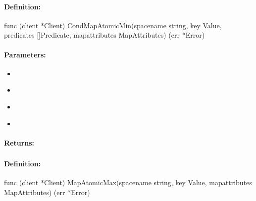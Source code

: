 \paragraph{Definition:}
\begin{gocode}
func (client *Client) CondMapAtomicMin(spacename string, key Value, predicates []Predicate, mapattributes MapAttributes) (err *Error)
\end{gocode}

\paragraph{Parameters:}
\begin{itemize}[noitemsep]
\item {}\\

\item {}\\

\item {}\\

\item {}\\

\end{itemize}

\paragraph{Returns:}


\pagebreak
\subsubsection{}
\label{api:Go:MapAtomicMax}


\paragraph{Definition:}
\begin{gocode}
func (client *Client) MapAtomicMax(spacename string, key Value, mapattributes MapAttributes) (err *Error)
\end{gocode}

